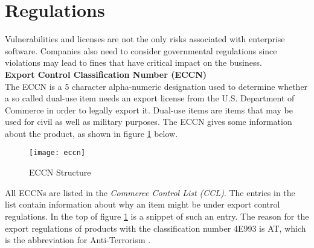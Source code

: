 \section{Regulations}
Vulnerabilities and licenses are not the only risks associated with enterprise software. Companies also need to consider governmental regulations since violations may lead to fines that have critical impact on the business.\\

\noindent
\textbf{Export Control Classification Number (ECCN)}\\
\noindent
The ECCN is a 5 character alpha-numeric designation used to determine whether a so called dual-use item needs an export license from the U.S. Department of Commerce in order to legally export it. Dual-use items are items that may be used for civil as well as military purposes. The ECCN gives some information about the product, as shown in figure \ref{fig:ECCN Structure} below.

\begin{figure}[H]
	\centering
	\texttt{[image: eccn]}
	\caption[ECCN Structure]{ECCN Structure }
	\label{fig:ECCN Structure}
\end{figure}

All ECCNs are listed in the \textit{Commerce Control List (CCL)}. The entries in the list contain information about why an item might be under export control regulations. In the top of figure \ref{fig:ECCN Structure} is a snippet of such an entry. The reason for the export regulations of products with the classification number 4E993 is AT, which is the abbreviation for Anti-Terrorism \cite{ECCN}. 